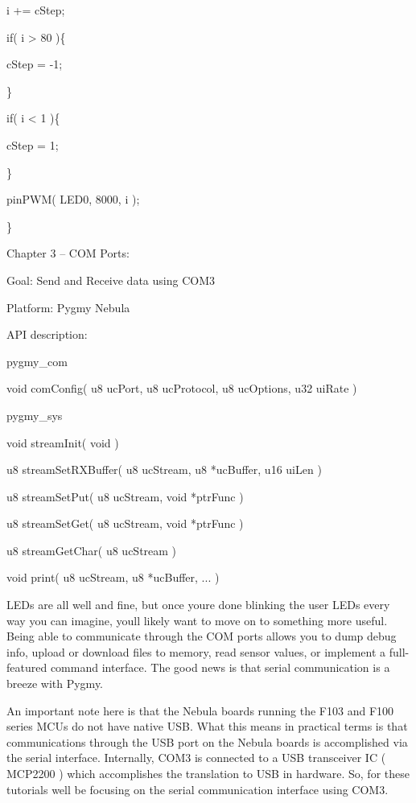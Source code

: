 \documentclass{article}
\begin{document}
\bigskip

 i += cStep;

 if( i {\textgreater} 80 )\{

cStep = -1;

\}

 if( i {\textless} 1 )\{

 cStep = 1;

\}

pinPWM( LED0, 8000, i );

\}


\bigskip

Chapter 3 -- COM Ports:


\bigskip

Goal: Send and Receive data using COM3

Platform: Pygmy Nebula

API description:

pygmy\_com

void comConfig( u8 ucPort, u8 ucProtocol, u8 ucOptions, u32 uiRate )

pygmy\_sys

void streamInit( void )

u8 streamSetRXBuffer( u8 ucStream, u8 *ucBuffer, u16 uiLen )

u8 streamSetPut( u8 ucStream, void *ptrFunc )

u8 streamSetGet( u8 ucStream, void *ptrFunc )

u8 streamGetChar( u8 ucStream )

void print( u8 ucStream, u8 *ucBuffer, ... )


\bigskip

LEDs are all well and fine, but once you{\textquotesingle}re done blinking the user LEDs every way you can imagine, you{\textquotesingle}ll likely want to move on to something more useful. Being able to communicate through the COM ports allows you to dump debug info, upload or download files to memory, read sensor values, or implement a full-featured command interface. The good news is that serial communication is a breeze with Pygmy.

An important note here is that the Nebula boards running the F103 and F100 series MCUs do not have native USB. What this means in practical terms is that communications through the USB port on the Nebula boards is accomplished via the serial interface. Internally, COM3 is connected to a USB transceiver IC ( MCP2200 ) which accomplishes the translation to USB in hardware. So, for these tutorials we{\textquotesingle}ll be focusing on the serial communication interface using COM3.
\end{document}
